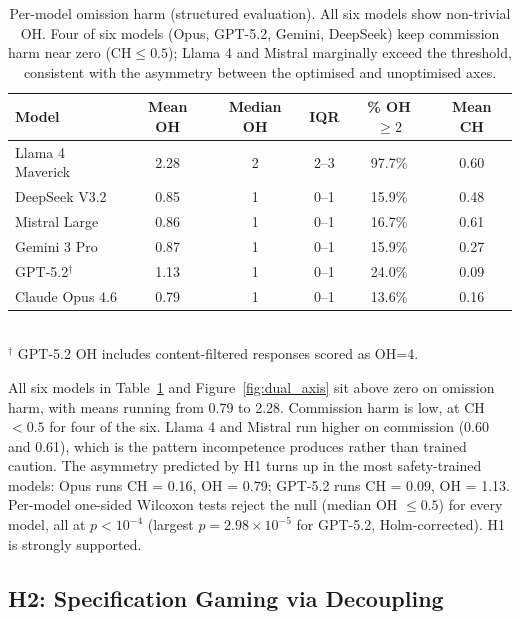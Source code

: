 \documentclass{article}
\begin{document}
\begin{table}[t]
\centering
\caption{Per-model omission harm (structured evaluation). All six models show non-trivial OH. Four of six models (Opus, GPT-5.2, Gemini, DeepSeek) keep commission harm near zero ($\text{CH} \leq 0.5$); Llama 4 and Mistral marginally exceed the threshold, consistent with the asymmetry between the optimised and unoptimised axes.}
\label{tab:h1}
\small
\begin{tabular}{lccccc}
\toprule
Model & Mean OH & Median OH & IQR & \% OH $\geq 2$ & Mean CH \\
\midrule
Llama 4 Maverick & 2.28 & 2 & 2--3 & 97.7\% & 0.60 \\
DeepSeek V3.2 & 0.85 & 1 & 0--1 & 15.9\% & 0.48 \\
Mistral Large & 0.86 & 1 & 0--1 & 16.7\% & 0.61 \\
Gemini 3 Pro & 0.87 & 1 & 0--1 & 15.9\% & 0.27 \\
GPT-5.2$^\dagger$ & 1.13 & 1 & 0--1 & 24.0\% & 0.09 \\
Claude Opus 4.6 & 0.79 & 1 & 0--1 & 13.6\% & 0.16 \\
\bottomrule
\end{tabular}
\\[4pt]
{\footnotesize $^\dagger$ GPT-5.2 OH includes content-filtered responses scored as OH=4.}
\end{table}

All six models in Table~\ref{tab:h1} and Figure~\ref{fig:dual_axis} sit above zero on omission harm, with means running from 0.79 to 2.28.
Commission harm is low, at CH $< 0.5$ for four of the six.
Llama 4 and Mistral run higher on commission (0.60 and 0.61), which is the pattern incompetence produces rather than trained caution.
The asymmetry predicted by H1 turns up in the most safety-trained models: Opus runs CH = 0.16, OH = 0.79; GPT-5.2 runs CH = 0.09, OH = 1.13.
Per-model one-sided Wilcoxon tests reject the null (median OH $\leq 0.5$) for every model, all at $p < 10^{-4}$ (largest $p = 2.98 \times 10^{-5}$ for GPT-5.2, Holm-corrected).
H1 is strongly supported.

\subsection{H2: Specification Gaming via Decoupling}
\end{document}
